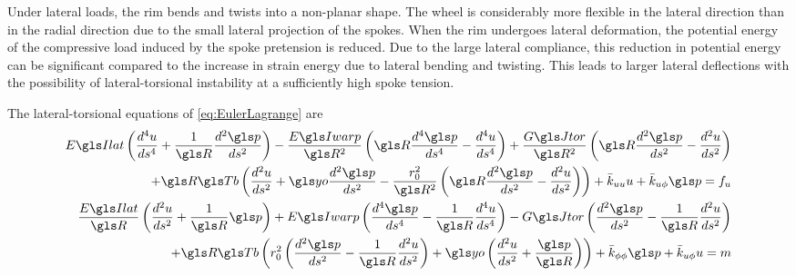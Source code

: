 \documentclass[\rootdir/thesis.tex]{subfiles}
\begin{document}
Under lateral loads, the rim bends and twists into a non-planar shape. The wheel is considerably more flexible in the lateral direction than in the radial direction due to the small lateral projection of the spokes. When the rim undergoes lateral deformation, the potential energy of the compressive load induced by the spoke pretension is reduced. Due to the large lateral compliance, this reduction in potential energy can be significant compared to the increase in strain energy due to lateral bending and twisting. This leads to larger lateral deflections with the possibility of lateral-torsional instability at a sufficiently high spoke tension.

The lateral-torsional equations of \eqref{eq:EulerLagrange} are
\begin{subequations}
\label{eq:lat_ode_2}
\begin{align}
\begin{split}
  \EIl\left( \ds{u}{4} + \frac{1}{\R}\ds{\p}{2} \right)
  - \frac{\EIw}{\R^2}\left( \R\ds{\p}{4} - \ds{u}{4} \right)
  + \frac{\GJ}{\R^2}\left( \R\ds{\p}{2} - \ds{u}{2} \right)\\
  + \R\Tb\left( \ds{u}{2} + \yo\ds{\p}{2}
                  -\frac{\ro^2}{\R^2}\left(\R\ds{\p}{2}
                                          -\ds{u}{2}\right) \right)
  + \kuu u + \kup \p = f_u
\end{split}\\
\begin{split}
  \frac{\EIl}{\R}\left( \ds{u}{2} + \frac{1}{\R}\p \right)
  + \EIw\left( \ds{\p}{4} - \frac{1}{\R}\ds{u}{4} \right)
  - \GJ\left( \ds{\p}{2} - \frac{1}{\R}\ds{u}{2} \right)\\
  + \R\Tb\left(\ro^2\left(\ds{\p}{2} - \frac{1}{\R}\ds{u}{2}\right)
                  +\yo\left( \ds{u}{2} + \frac{\p}{\R} \right)\right)
  + \kpp \p + \kup u = m
\end{split}
\end{align}
\end{subequations}
\end{document}
